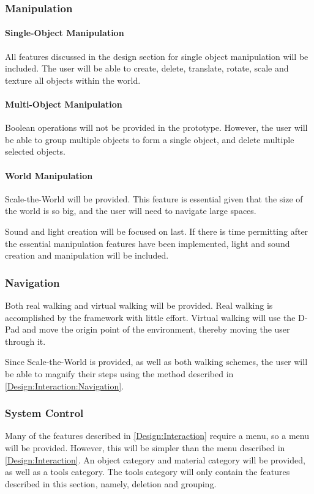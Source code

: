 \subsubsection{Manipulation}
\paragraph{Single-Object Manipulation}
All features discussed in the design section for single object manipulation will be included.
The user will be able to create, delete, translate, rotate, scale and texture all objects within the world.

\paragraph{Multi-Object Manipulation}
Boolean operations will not be provided in the prototype.
However, the user will be able to group multiple objects to form a single object, and delete multiple selected objects.

\paragraph{World Manipulation}
Scale-the-World will be provided.
This feature is essential given that the size of the world is so big, and the user will need to navigate large spaces.

Sound and light creation will be focused on last.
If there is time permitting after the essential manipulation features have been implemented, light and sound creation and manipulation will be included.

\subsubsection{Navigation}
Both real walking and virtual walking will be provided.
Real walking is accomplished by the framework with little effort.
Virtual walking will use the D-Pad and move the origin point of the environment, thereby moving the user through it.

Since Scale-the-World is provided, as well as both walking schemes, the user will be able to magnify their steps using the method described in \ref{Design:Interaction:Navigation}.

\subsubsection{System Control}
Many of the features described in \ref{Design:Interaction} require a menu, so a menu will be provided.
However, this will be simpler than the menu described in \ref{Design:Interaction}.
An object category and material category will be provided, as well as a tools category.
The tools category will only contain the features described in this section, namely, deletion and grouping.

